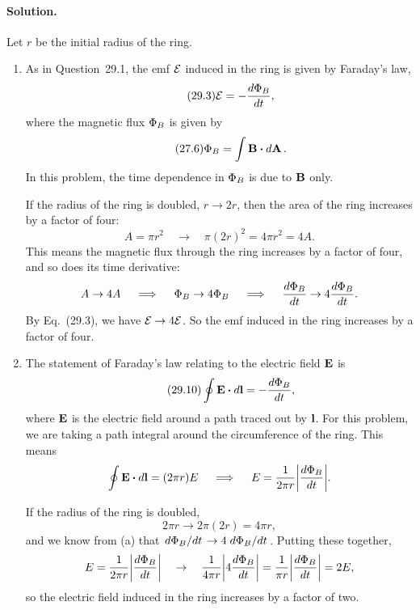 \documentclass[11pt]{article}
\newcommand{\beq}{\begin{equation*}}
\newcommand{\eeq}{\end{equation*}}
\newcommand{\beqn}{\begin{equation}}
\newcommand{\eeqn}{\end{equation}}
\newenvironment{solution}
{
    \paragraph{Solution.}
    \ignorespaces
}
{
    \bigskip
}
\newcommand{\qimplies}{\quad \implies \quad}
\newcommand{\qto}{\quad \to \quad}
\begin{document}
\begin{solution}
	Let $r$ be the initial radius of the ring.
	\begin{enumerate}
		\item As in Question~29.1, the emf $\mathcal{E}$ induced in the ring is given by Faraday's law,
			\beq \tag{29.3}
				\cE = -\dv{\PhiB}{t},
			\eeq
			where the magnetic flux $\Phi_B$ is given by
			\beqn \tag{27.6}
				\PhiB = \int \vB \vdot \dd{\vA}.
			\eeqn
			In this problem, the time dependence in $\Phi_B$ is due to $\vb{B}$ only.
			
			If the radius of the ring is doubled, $r \to 2r$, then the area of the ring increases by a factor of four:
			\beq
				A = \pi r^2
				\qto
				\pi (2r)^2 = 4 \pi r^2 = 4A.
			\eeq
			This means the magnetic flux through the ring increases by a factor of four, and so does its time derivative:
			\beq
				A \to 4A
				\qimplies
				\PhiB \to 4\PhiB
				\qimplies
				\dv{\PhiB}{t} \to 4 \dv{\PhiB}{t}.
			\eeq
			By Eq.~(29.3), we have $\mathcal{E} \to 4 \mathcal{E}$.  So the emf induced in the ring increases by a factor of four.
			
		\item The statement of Faraday's law relating to the electric field $\vb{E}$ is
			\beqn \tag{29.10}
				\oint \vE \vdot \dd{\vl} = -\dv{\PhiB}{t},
			\eeqn
			where $\vb{E}$ is the electric field around a path traced out by $\vb{l}$.  For this problem, we are taking a path integral around the circumference of the ring.  This means
			\beq
				\oint \vE \vdot \dd{\vl} = (2\pi r) E
				\qimplies
				E = \frac{1}{2\pi r} \abs{\dv{\PhiB}{t}}.
			\eeq

			If the radius of the ring is doubled,
			\beq
				2\pi r \to 2\pi (2r) = 4\pi r,
			\eeq
			and we know from (a) that $\dv*{\Phi_B}{t} \to 4 \dv*{\Phi_B}{t}$.  Putting these together,
			\beq
				E = \frac{1}{2\pi r} \abs{\dv{\PhiB}{t}}
				\qto
				\frac{1}{4\pi r} \abs{4 \dv{\PhiB}{t}} = \frac{1}{\pi r} \abs{\dv{\PhiB}{t}} = 2E,
			\eeq
			so the electric field induced in the ring increases by a factor of two.
	\end{enumerate}
\end{solution}



\newcommand{\intab}{\int_a^b}
\end{document}
